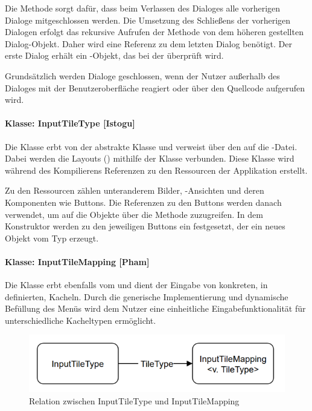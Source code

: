 Die Methode  sorgt dafür, dass beim Verlassen des Dialoges alle vorherigen Dialoge mitgeschlossen werden. Die Umsetzung des Schließens der vorherigen Dialogen erfolgt das rekursive Aufrufen der Methode  von dem höheren gestellten Dialog-Objekt. Daher wird eine Referenz zu dem letzten Dialog benötigt. Der erste Dialog erhält ein -Objekt, das bei der  überprüft wird.   

Grundsätzlich werden Dialoge geschlossen, wenn der Nutzer außerhalb des Dialoges mit der Benutzeroberfläche reagiert oder über den Quellcode  aufgerufen wird.  

\paragraph{Klasse: InputTileType [Istogu]}

Die Klasse erbt von der abstrakte Klasse  und verweist über den  auf die -Datei. Dabei werden die Layouts () mithilfe der Klasse  verbunden. Diese Klasse wird während des Kompilierens Referenzen zu den Ressourcen der Applikation erstellt. 

Zu den Ressourcen zählen unteranderem Bilder, -Ansichten und deren Komponenten wie Buttons. Die Referenzen zu den Buttons werden danach verwendet, um auf die Objekte über die Methode  zuzugreifen. In dem Konstruktor werden zu den jeweiligen Buttons ein  festgesetzt, der ein neues Objekt vom Typ  erzeugt.

\paragraph{Klasse: InputTileMapping [Pham]}
Die Klasse  erbt ebenfalls vom  und dient der Eingabe von konkreten, in  definierten, Kacheln. Durch die generische Implementierung und dynamische Befüllung des Menüs wird dem Nutzer eine einheitliche Eingabefunktionalität für unterschiedliche Kacheltypen ermöglicht. 

\begin{figure}[h]
	\includegraphics[scale=1]{img/relation-tiletype-tilemapping}
	\caption[Relation zwischen InputTileType und InputTileMapping]{Relation zwischen InputTileType und InputTileMapping\footnotemark}
\end{figure}

